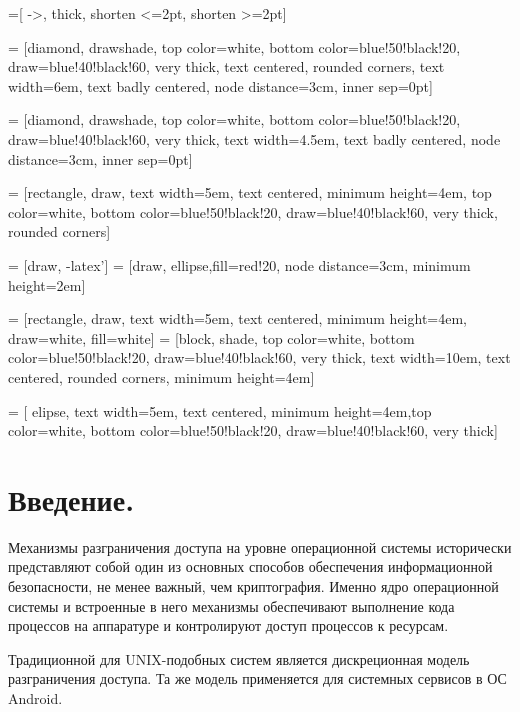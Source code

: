  =[ ->,
	thick,
	shorten <=2pt,
	shorten >=2pt]

 = [diamond, drawshade, top color=white,
    bottom color=blue!50!black!20, draw=blue!40!black!60, very
    thick, text centered, rounded corners, text width=6em, text badly centered, node distance=3cm, inner sep=0pt]

  = [diamond, drawshade,  top color=white,
    bottom color=blue!50!black!20, draw=blue!40!black!60, very
    thick, text width=4.5em, text badly centered, node distance=3cm, inner sep=0pt]

  = [rectangle, draw,  text width=5em, text centered, minimum height=4em, top color=white,  bottom color=blue!50!black!20, draw=blue!40!black!60, very thick, rounded corners]

 = [draw, -latex']
 = [draw, ellipse,fill=red!20, node distance=3cm,
    minimum height=2em]
   
 = [rectangle, draw,  text width=5em, text centered, minimum height=4em, draw=white, fill=white]
 = [block, shade, top color=white,
    bottom color=blue!50!black!20, draw=blue!40!black!60, very
    thick, text width=10em, text centered, rounded corners, minimum height=4em]

 = [ elipse, text width=5em, text centered, minimum height=4em,top color=white,
    bottom color=blue!50!black!20, draw=blue!40!black!60, very thick]

\bigskip 
\section{Введение.}

Механизмы разграничения доступа на уровне операционной
системы исторически представляют собой один из основных способов
обеспечения информационной безопасности, не менее
важный, чем криптография. Именно ядро операционной системы
и встроенные в него механизмы обеспечивают выполнение
кода процессов на аппаратуре и контролируют доступ
процессов к ресурсам.

Традиционной для UNIX-подобных систем является дискреционная модель
разграничения доступа. Та же модель применяется для системных сервисов в ОС
Android.

